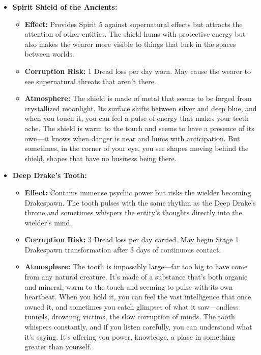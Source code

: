 \documentclass[11pt]{article}
\begin{document}
\begin{itemize}
\item \textbf{Spirit Shield of the Ancients:} 
  \begin{itemize}
  \item \textbf{Effect:} Provides Spirit 5 against supernatural effects but attracts the attention of other entities. The shield hums with protective energy but also makes the wearer more visible to things that lurk in the spaces between worlds.
  \item \textbf{Corruption Risk:} 1 Dread loss per day worn. May cause the wearer to see supernatural threats that aren't there.
  \item \textbf{Atmosphere:} The shield is made of metal that seems to be forged from crystallized moonlight. Its surface shifts between silver and deep blue, and when you touch it, you can feel a pulse of energy that makes your teeth ache. The shield is warm to the touch and seems to have a presence of its own---it knows when danger is near and hums with anticipation. But sometimes, in the corner of your eye, you see shapes moving behind the shield, shapes that have no business being there.
  \end{itemize}
\item \textbf{Deep Drake's Tooth:} 
  \begin{itemize}
  \item \textbf{Effect:} Contains immense psychic power but risks the wielder becoming Drakespawn. The tooth pulses with the same rhythm as the Deep Drake's throne and sometimes whispers the entity's thoughts directly into the wielder's mind.
  \item \textbf{Corruption Risk:} 3 Dread loss per day carried. May begin Stage 1 Drakespawn transformation after 3 days of continuous contact.
  \item \textbf{Atmosphere:} The tooth is impossibly large---far too big to have come from any natural creature. It's made of a substance that's both organic and mineral, warm to the touch and seeming to pulse with its own heartbeat. When you hold it, you can feel the vast intelligence that once owned it, and sometimes you catch glimpses of what it saw---endless tunnels, drowning victims, the slow corruption of minds. The tooth whispers constantly, and if you listen carefully, you can understand what it's saying. It's offering you power, knowledge, a place in something greater than yourself.
  \end{itemize}
\end{itemize}
\end{document}
